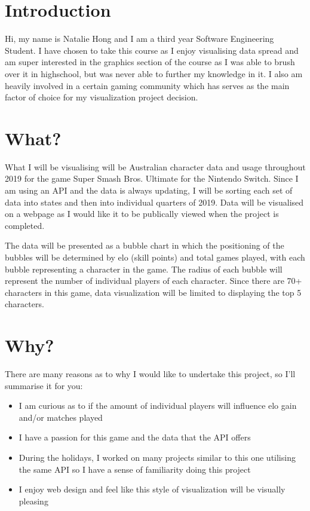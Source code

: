 \documentclass[11pt, oneside, a4paper]{article}
\begin{document}
\section*{Introduction}
Hi, my name is Natalie Hong and I am a third year Software Engineering Student. I have chosen to take this course as I enjoy visualising data spread and am super interested in the graphics section of the course as I was able to brush over it in highschool, but was never able to further my knowledge in it.
I also am heavily involved in a certain gaming community which has serves as the main factor of choice for my visualization project decision.

\section*{What?}
What I will be visualising will be Australian character data and usage throughout 2019 for the game Super Smash Bros. Ultimate for the Nintendo Switch. 
Since I am using an API and the data is always updating, I will be sorting each set of data into states and then into individual quarters of 2019.
Data will be visualised on a webpage as I would like it to be publically viewed when the project is completed.

The data will be presented as a bubble chart in which the positioning of the bubbles will be determined by elo (skill points) and total games played, with each bubble representing a character in the game. The radius of each bubble will represent the number of individual players of each character.
Since there are 70+ characters in this game, data visualization will be limited to displaying the top 5 characters.

\section*{Why?}
There are many reasons as to why I would like to undertake this project, so I'll summarise it for you:
\begin{itemize}
    \item I am curious as to if the amount of individual players will influence elo gain and/or matches played 
    \item I have a passion for this game and the data that the API offers
    \item During the holidays, I worked on many projects similar to this one utilising the same API so I have a sense of familiarity doing this project
    \item I enjoy web design and feel like this style of visualization will be visually pleasing 
\end{itemize}
\end{document}
